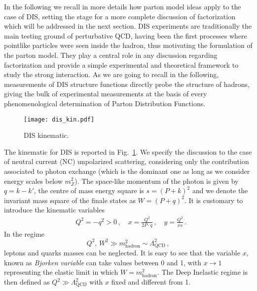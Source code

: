 %
In the following we recall in more details how parton model ideas apply to the case of 
DIS, setting the stage for a more complete 
discussion of factorization which will be addressed in the next section. %
DIS experiments are traditionally the main testing ground of perturbative QCD,
having been the first processes where pointlike particles were seen inside the hadron, 
thus motivating the formulation of the parton model. 
They play a central role in any discussion regarding factorization and provide a simple experimental and theoretical framework to
study the strong interaction.
As we are going to recall in the following, measurements of DIS structure functions directly probe the structure of hadrons, 
giving the bulk of experimental measurements at the basis of every phenomenological determination of Parton Distribution Functions.

\begin{figure}[h!]
    \center
    \texttt{[image: dis\_kin.pdf]}
    \caption{DIS kinematic.}
    \label{fig:DIS_kin}
\end{figure}

The kinematic for DIS is reported in Fig.~\ref{fig:DIS_kin}.
We specify the discussion to the case of neutral current (NC) unpolarized scattering, 
considering only the contribution associated to photon exchange (which is the dominant one as long as
we consider energy scales below $m_Z^2$).
The space-like momentum of the photon is given by $q = k - k'$, the centre of mass energy square is $s=\left(P+k\right)^2$ and
we denote the invariant mass square of the finale states as $W = \left(P+q\right)^2$.
It is customary to introduce the kinematic variables
\begin{align}
	\label{eq:DIS_kinematic}
    & Q^2 = -q^2 > 0\,, \,\,\,\,\,\, x = \frac{Q^2}{2P\cdot q}\,, \,\,\,\,\,\, y = \frac{Q^2}{x s}\,.
\end{align}
In the regime 
$$ Q^2,\, W^2 \gg m^2_{\text{hadron}} \sim \Lambda^2_{\text{QCD}}\,, $$ 
leptons and quarks masses can be neglected.
It is easy to see that the variable $x$, known as \textit{Bjorken variable} can take values between 0 and 1, 
with $x\rightarrow 1$ representing the elastic limit in which $W=m^2_{\text{hadron}}$. The Deep Inelastic regime
is then defined as $Q^2 \gg \Lambda^2_{\text{QCD}} $ with $x$ fixed and different from 1.

